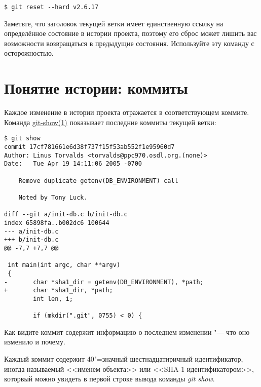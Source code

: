 \documentclass[a4paper, 12pt, oneside]{scrreprt}
\begin{document}
\begin{lstlisting}
$ git reset --hard v2.6.17
\end{lstlisting}

Заметьте, что заголовок текущей ветки имеет единственную ссылку на определённое состояние
в истории проекта, поэтому его сброс может лишить вас возможности возвращаться в
предыдущие состояния. Используйте эту команду с осторожностью.


\section{Понятие истории: коммиты}

Каждое изменение в истории проекта отражается в соответствующем коммите. Команда
\href{http://www.kernel.org/pub/software/scm/git/docs/git-show.html}{git-show(1)}
показывает последние коммиты текущей ветки:

\begin{lstlisting}
$ git show
commit 17cf781661e6d38f737f15f53ab552f1e95960d7
Author: Linus Torvalds <torvalds@ppc970.osdl.org.(none)>
Date:   Tue Apr 19 14:11:06 2005 -0700

    Remove duplicate getenv(DB_ENVIRONMENT) call

    Noted by Tony Luck.

diff --git a/init-db.c b/init-db.c
index 65898fa..b002dc6 100644
--- a/init-db.c
+++ b/init-db.c
@@ -7,7 +7,7 @@

 int main(int argc, char **argv)
 {
-       char *sha1_dir = getenv(DB_ENVIRONMENT), *path;
+       char *sha1_dir, *path;
        int len, i;

        if (mkdir(".git", 0755) < 0) {
\end{lstlisting}

Как видите коммит содержит информацию о последнем изменении "--- что оно изменило
и почему.

Каждый коммит содержит 40"=значный шестнадцатиричный идентификатор, иногда называемый
<<именем объекта>> или <<SHA-1 идентификатором>>, которвый можно увидеть в первой
строке вывода команды \emph{git show}.
%
%
\end{document}

